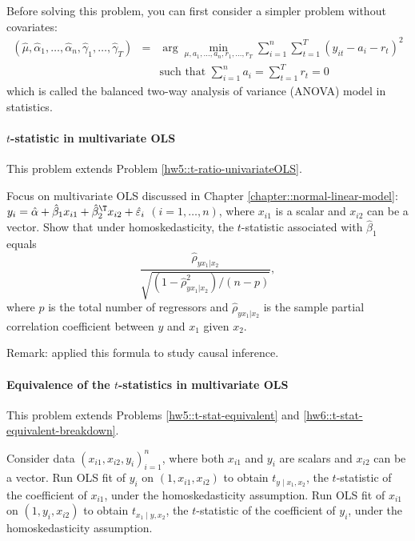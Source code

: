 Before solving this problem, you can first consider a simpler problem without covariates:
\begin{eqnarray*}
(\hat{\mu}, \hat{\alpha}_1, \ldots, \hat{\alpha}_n, \hat{\gamma}_1, \ldots, \hat{\gamma}_T)
&=& \arg\min_{\mu, a_1, \ldots, a_n, r_1, \ldots, r_T} \sum_{i=1}^n \sum_{t=1}^T
( y_{it} - a_i - r_t  )^2\\
&&\text{such that } \sum_{i=1}^n a_i = \sum_{t=1}^T r_t = 0
\end{eqnarray*}
which is called the balanced two-way analysis of variance (ANOVA) model in statistics. 


\paragraph{$t$-statistic in multivariate OLS}
\label{hw7::tstat-partialcorr-OLS}

This problem extends Problem \ref{hw5::t-ratio-univariateOLS}.


Focus on multivariate OLS discussed in Chapter \ref{chapter::normal-linear-model}: $y_i = \hat{\alpha}  +  \hat{\beta}_1 x_{i1} + \hat{\beta}_2^{\T} x_{i2} +  \hat{\varepsilon}_i$ $(i=1,\ldots, n)$, where $x_{i1}$ is a scalar and $x_{i2}$ can be a vector.  
Show that under homoskedasticity, the $t$-statistic associated with $ \hat{\beta}_1$ equals
$$
\frac{  \hat{\rho}_{yx_1|x_2}   }{  \sqrt{    (1  -  \hat{\rho}_{yx_1|x_2} ^2) /(n-p)  }   },
$$
where $p$ is the total number of regressors and $\hat{\rho}_{yx_1|x_2}$ is the sample partial correlation coefficient between $y$ and $x_1$ given $x_2$. 



Remark: \citet{frank2000impact} applied this formula to study causal inference. 





\paragraph{Equivalence of the $t$-statistics in multivariate OLS}\label{hw7::t-stat-equivalent-multivariateOLS}


This problem extends Problems \ref{hw5::t-stat-equivalent} and \ref{hw6::t-stat-equivalent-breakdown}.  



Consider data $(x_{i1}, x_{i2}, y_i)_{i=1}^n$, where both $x_{i1}$ and $y_i$ are scalars and $x_{i2}$ can be a vector. Run OLS fit of $y_i$ on $(1,x_{i1}, x_{i2})$ to obtain $t_{y\mid x_1, x_2}$, the $t$-statistic of the coefficient of $x_{i1}$, under the homoskedasticity assumption. Run OLS fit of $x_{i1}$ on $(1, y_i, x_{i2})$ to obtain $t_{x_1\mid y, x_2}$, the $t$-statistic of the coefficient of $y_i$, under the homoskedasticity assumption. 

